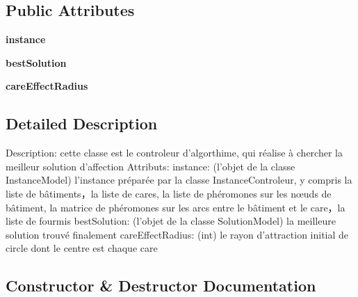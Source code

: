 \subsection*{Public Attributes}
\begin{DoxyCompactItemize}
\item 
\mbox{\label{class_algorithm_controller_1_1_algorithm_controller_ae5b0382b72120d0b7412baa3e59b2b82}} 
{\bfseries instance}
\item 
\mbox{\label{class_algorithm_controller_1_1_algorithm_controller_a562b9b093fd7ff0cfedb6b7a814e92f8}} 
{\bfseries best\+Solution}
\item 
\mbox{\label{class_algorithm_controller_1_1_algorithm_controller_a10c4b05a70d8fea5c86e4dd936f57914}} 
{\bfseries care\+Effect\+Radius}
\end{DoxyCompactItemize}


\subsection{Detailed Description}
\begin{DoxyVerb}Description: cette classe est le controleur d'algorthime, qui réalise à chercher la meilleur solution d'affection
Attributs:
    instance: (l'objet de la classe InstanceModel) l'instance préparée par la classe InstanceControleur,
                y compris la liste de bâtiments，la liste de cares, la liste de phéromones sur les nœuds de bâtiment,
                la matrice de phéromones sur les arcs entre le bâtiment et le care，la liste de fourmis
    bestSolution: (l'objet de la classe SolutionModel) la meilleure solution trouvé finalement
    careEffectRadius: (int) le rayon d'attraction initial de circle dont le centre est chaque care
\end{DoxyVerb}
 

\subsection{Constructor \& Destructor Documentation}
\mbox{\label{class_algorithm_controller_1_1_algorithm_controller_a2f8217779ecd4b8ffbcb6869a8abf5ef}} 
